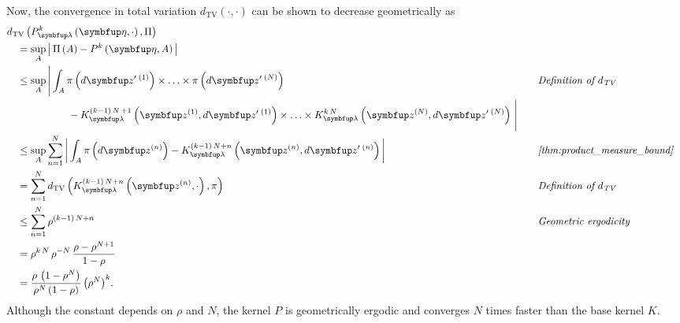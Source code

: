 \begin{proofEnd}
  Now, the convergence in total variation \(d_{\mathrm{TV}}\left(\cdot, \cdot\right)\) can be shown to decrease geometrically as
  \begin{alignat}{2}
    &\DTV{P_{\vlambda}^{k}\left(\veta, \cdot\right)}{\Pi}
    \nonumber
    \\
    &\quad=
    \sup_{A}
    \abs{
      \Pi\left(A\right)
      -
      P^{k}\left(\veta, A\right)
    }
    \nonumber
    \\
    &\quad\leq
    \sup_{A}
    \Bigg|
    \int_{A}
      \pi\left(d\vz^{\prime\;(1)}\right) \times \ldots \times \pi\left(d\vz^{\prime\;(N)}\right)
    \nonumber
    &&\quad\text{\textit{Definition of \(d_{\text{TV}}\)}}
      \\
      &\qquad\qquad\qquad-
      K^{(k-1)\,N\,+1}_{\vlambda}\left(\vz^{(1)}, d\vz^{\prime\;(1)}\right) \times \ldots \times K^{k\,N}_{\vlambda}\left(\vz^{(N)}, d\vz^{\prime\;(N)}\right)
    \,\Bigg|
    \nonumber
    \\
    &\quad\leq
    \sup_{A}
    \sum_{n=1}^N
    \abs{
    \int_{A}
      \pi\left(d\vz^{(n)}\right) - K^{(k-1)\,N + n}_{\vlambda}\left(\vz^{(n)}, d\vz^{\prime\;(n)}\right) 
    }
    &&\quad\text{\textit{\cref{thm:product_measure_bound}}}
    \nonumber
    \\
    &\quad=
    \sum_{n=1}^N
    \DTV{K^{(k-1)\,N + n}_{\vlambda}\left(\vz^{(n)}, \cdot\right)}{\pi}
    &&\quad\text{\textit{Definition of \(d_{\text{TV}}\)}}
    \nonumber
    \\
    &\quad\leq
    \sum_{n=1}^N
    \rho^{(k-1)\,N + n}
    &&\quad\text{\textit{Geometric ergodicity}}
    \nonumber
    \\
    &\quad=
    \rho^{k\,N}
    \,
    \rho^{-N}
    \,
    \frac{\rho - \rho^{N+1}}{1 - \rho}
    \nonumber
    \\
    &\quad=
    \frac{\rho \, \left(1 - \rho^N\right)}{\rho^N \left(1 - \rho\right)}
    \,
    {\left( \rho^{N} \right)}^k.
    \nonumber
  \end{alignat}
  Although the constant depends on \(\rho\) and \(N\), the kernel \(P\) is geometrically ergodic and converges \(N\) times faster than the base kernel \(K\).


\end{proofEnd}
